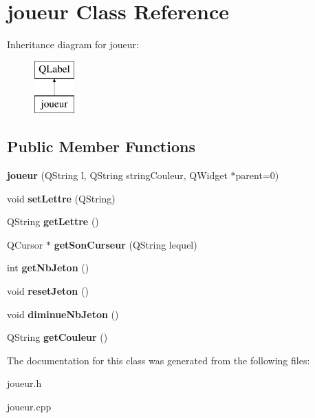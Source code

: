 \hypertarget{classjoueur}{\section{joueur Class Reference}
\label{classjoueur}
}
Inheritance diagram for joueur\-:\begin{figure}[H]
\begin{center}
\leavevmode
\includegraphics[height=2.000000cm]{classjoueur}
\end{center}
\end{figure}
\subsection*{Public Member Functions}
\begin{DoxyCompactItemize}
\item 
\hypertarget{classjoueur_a9f78a65e07011114967ef5c813a868cb}{{\bfseries joueur} (Q\-String l, Q\-String string\-Couleur, Q\-Widget $\ast$parent=0)}\label{classjoueur_a9f78a65e07011114967ef5c813a868cb}

\item 
\hypertarget{classjoueur_a6095d00e5c84a98694ae3f2ebbef48d8}{void {\bfseries set\-Lettre} (Q\-String)}\label{classjoueur_a6095d00e5c84a98694ae3f2ebbef48d8}

\item 
\hypertarget{classjoueur_a7a91ed8fa89ad62545bae8e805565c39}{Q\-String {\bfseries get\-Lettre} ()}\label{classjoueur_a7a91ed8fa89ad62545bae8e805565c39}

\item 
\hypertarget{classjoueur_a19403939c10d9a70b6035024978ca230}{Q\-Cursor $\ast$ {\bfseries get\-Son\-Curseur} (Q\-String lequel)}\label{classjoueur_a19403939c10d9a70b6035024978ca230}

\item 
\hypertarget{classjoueur_a80aefa29f51995d731605b5230840ac3}{int {\bfseries get\-Nb\-Jeton} ()}\label{classjoueur_a80aefa29f51995d731605b5230840ac3}

\item 
\hypertarget{classjoueur_a15c0ea5487cf6800e373cb1b1ed52b12}{void {\bfseries reset\-Jeton} ()}\label{classjoueur_a15c0ea5487cf6800e373cb1b1ed52b12}

\item 
\hypertarget{classjoueur_a1a1b8731c7eec4f854a65d83c3f6fc70}{void {\bfseries diminue\-Nb\-Jeton} ()}\label{classjoueur_a1a1b8731c7eec4f854a65d83c3f6fc70}

\item 
\hypertarget{classjoueur_a2992fc3e5e7f08794c001db796f5e925}{Q\-String {\bfseries get\-Couleur} ()}\label{classjoueur_a2992fc3e5e7f08794c001db796f5e925}

\end{DoxyCompactItemize}


The documentation for this class was generated from the following files\-:\begin{DoxyCompactItemize}
\item 
joueur.\-h\item 
joueur.\-cpp\end{DoxyCompactItemize}
